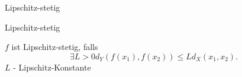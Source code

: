 \documentclass[class=article, crop=false]{standalone}
\begin{document}
\begin{zettel}{Lipschitz-stetig}
\begin{flashcard}[6s4b1gm4]{Lipschitz-stetig}
	\begin{definition}
		$f$ ist Lipschitz-stetig, falls
		\[
			\exists L > 0 d_Y (f(x_1),f(x_2)) \leq L d_X (x_1,x_2)
		.\]
		$L$ - Lipschitz-Konstante
	\end{definition}
\end{flashcard}
\end{zettel}
\end{document}

